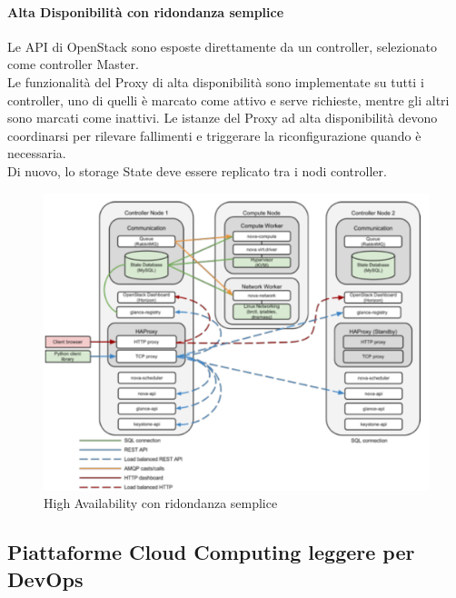 \documentclass{article}
\begin{document}
\paragraph{Alta Disponibilità con ridondanza semplice}
Le API di OpenStack sono esposte direttamente da un controller, selezionato come controller Master. \\
Le funzionalità del Proxy di alta disponibilità sono implementate su tutti i controller, uno di quelli è marcato come attivo e serve richieste, mentre gli altri sono marcati come inattivi. Le istanze del Proxy ad alta disponibilità devono coordinarsi per rilevare fallimenti e triggerare la riconfigurazione quando è necessaria. \\ 
Di nuovo, lo storage State deve essere replicato tra i nodi controller.
\begin{figure}[H]
    \centering
    \includegraphics[scale=0.3]{img/high availability 3.png}
    \caption{High Availability con ridondanza semplice}
\end{figure}\noindent
\newpage
\subsection{Piattaforme Cloud Computing leggere per DevOps}
\end{document}
